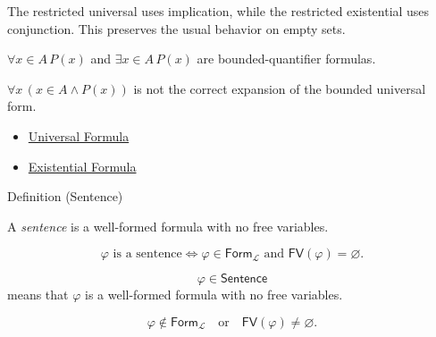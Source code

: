 \begin{remark*}[Interpretation]
The restricted universal uses implication, while the restricted existential
uses conjunction. This preserves the usual behavior on empty sets.
\end{remark*}

\begin{remark*}[Examples]
\(\forall x\in A\,P(x)\) and \(\exists x\in A\,P(x)\) are bounded-quantifier
formulas.
\end{remark*}

\begin{remark*}
\(\forall x\,(x\in A\land P(x))\) is not the correct expansion of the bounded
universal form.
\end{remark*}

\begin{dependencies}
\begin{itemize}
  \item \hyperref[def:universal-q]{Universal Formula}
  \item \hyperref[def:existential-q]{Existential Formula}
\end{itemize}
\end{dependencies}

\begin{definitionbox}{Definition (Sentence)}
\begin{definition}[Sentence]
\label{def:sentence-predicate-logic}
A \emph{sentence} is a well-formed formula with no free variables.
\end{definition}
\end{definitionbox}

\begin{remark*}
\[
\varphi \text{ is a sentence}
\Longleftrightarrow
\varphi\in\mathsf{Form}_{\mathcal L}
\text{ and }
\mathsf{FV}(\varphi)=\varnothing.
\]
\end{remark*}

\begin{remark*}
\[
  \varphi\in\mathsf{Sentence}
\] means that \(\varphi\) is a well-formed
formula with no free variables.
\end{remark*}

\begin{remark*}
\[
\varphi\notin\mathsf{Form}_{\mathcal L}
\quad\text{or}\quad
\mathsf{FV}(\varphi)\neq\varnothing.
\]
\end{remark*}

